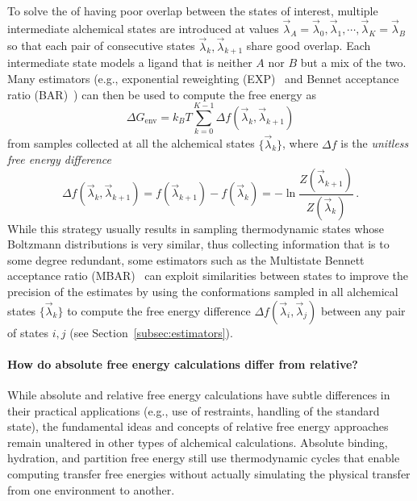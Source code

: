 \documentclass[9pt,bestpractices]{livecoms}
\begin{document}
To solve the of having poor overlap between the states of interest, multiple intermediate alchemical states are introduced at values $\vec{\lambda}_A = \vec{\lambda}_0, \vec{\lambda}_1, \cdots, \vec{\lambda}_K = \vec{\lambda}_B$ so that each pair of consecutive states $\vec{\lambda}_k, \vec{\lambda}_{k+1}$ share good overlap.
Each intermediate state models a ligand that is neither $A$ nor $B$ but a mix of the two.
Many estimators (e.g., exponential reweighting (EXP)~\cite{zwanzig1954hightemperature} and Bennet acceptance ratio (BAR)~\cite{bennett1976efficient,shirts2003equilibriuma}) can then be used to compute the free energy as
\begin{equation}
    \Delta G_{\mathrm{env}} = k_BT \sum_{k=0}^{K-1} \Delta f(\vec{\lambda}_k, \vec{\lambda}_{k+1})
\end{equation}
from samples collected at all the alchemical states $\{\vec{\lambda}_k \}$, where $\Delta f$ is the \emph{unitless free energy difference}
\begin{equation}
    \Delta f(\vec{\lambda}_k, \vec{\lambda}_{k+1}) = f(\vec{\lambda}_{k+1}) - f(\vec{\lambda}_k) = - \ln \frac{Z(\vec{\lambda}_{k+1})}{Z(\vec{\lambda}_k)} \, .
\end{equation}
While this strategy usually results in sampling thermodynamic states whose Boltzmann distributions is very similar, thus collecting information that is to some degree redundant, some estimators such as the Multistate Bennett acceptance ratio (MBAR)~\cite{shirts2008statisticallya} can exploit similarities between states to improve the precision of the estimates by using the conformations sampled in all alchemical states $\{\vec{\lambda}_k \}$ to compute the free energy difference $\Delta f(\vec{\lambda}_i, \vec{\lambda}_{j})$ between any pair of states $i,j$  (see Section~\ref{subsec:estimators}).

\paragraph{How do absolute free energy calculations differ from relative?}

While absolute and relative free energy calculations have subtle differences in their practical applications (e.g., use of restraints, handling of the standard state), the fundamental ideas and concepts of relative free energy approaches remain unaltered in other types of alchemical calculations.
Absolute binding, hydration, and partition free energy still use thermodynamic cycles that enable computing transfer free energies without actually simulating the physical transfer from one environment to another.
\end{document}
